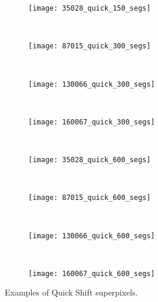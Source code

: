 \begin{figure}[!ht]
    \begin{subfigure}[t]{\textwidth+20pt\relax}
    	\texttt{[image: 35028\_quick\_150\_segs]} 
    \end{subfigure}      
    ~ %
    \begin{subfigure}[b]{0.2\textwidth}
        \texttt{[image: 87015\_quick\_300\_segs]}
    \end{subfigure}
    ~ %
    \begin{subfigure}[b]{0.2\textwidth}
        \texttt{[image: 130066\_quick\_300\_segs]}
    \end{subfigure}
    ~ %
    \begin{subfigure}[b]{0.2\textwidth}
        \texttt{[image: 160067\_quick\_300\_segs]}
    \end{subfigure} \\ [2ex]
    
    \begin{subfigure}[t]{\textwidth+20pt\relax}
    	\texttt{[image: 35028\_quick\_600\_segs]} 
    \end{subfigure}      
    ~ %
    \begin{subfigure}[b]{0.2\textwidth}
        \texttt{[image: 87015\_quick\_600\_segs]}
    \end{subfigure}
    ~ %
    \begin{subfigure}[b]{0.2\textwidth}
        \texttt{[image: 130066\_quick\_600\_segs]}
    \end{subfigure}
    ~ %
    \begin{subfigure}[b]{0.2\textwidth}
        \texttt{[image: 160067\_quick\_600\_segs]}
    \end{subfigure}     

	\caption{Examples of Quick Shift superpixels.}\label{fig:quick_suprepixels}    
\end{figure}

